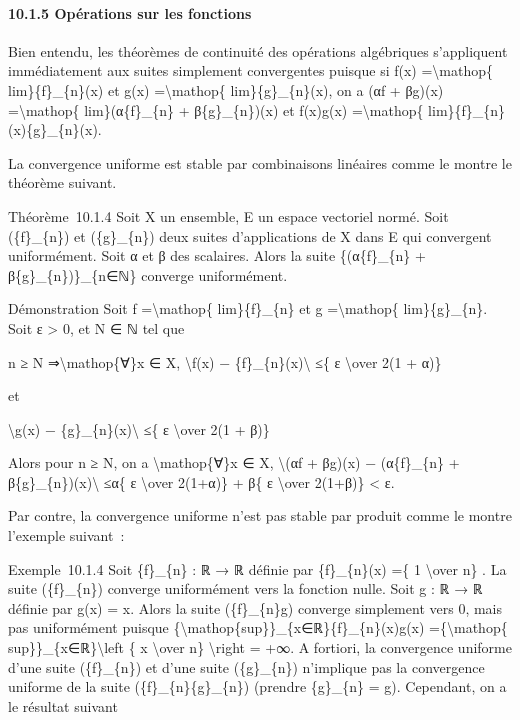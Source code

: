\documentclass[]{article}
\begin{document}
\paragraph{10.1.5 Opérations sur les fonctions}

Bien entendu, les théorèmes de continuité des opérations algébriques
s'appliquent immédiatement aux suites simplement convergentes puisque si
f(x) =\textbackslash{}mathop\{ lim\}\{f\}\_\{n\}(x) et g(x)
=\textbackslash{}mathop\{ lim\}\{g\}\_\{n\}(x), on a (αf + βg)(x)
=\textbackslash{}mathop\{ lim\}(α\{f\}\_\{n\} + β\{g\}\_\{n\})(x) et
f(x)g(x) =\textbackslash{}mathop\{ lim\}\{f\}\_\{n\}(x)\{g\}\_\{n\}(x).

La convergence uniforme est stable par combinaisons linéaires comme le
montre le théorème suivant.

Théorème~10.1.4 Soit X un ensemble, E un espace vectoriel normé. Soit
(\{f\}\_\{n\}) et (\{g\}\_\{n\}) deux suites d'applications de X dans E
qui convergent uniformément. Soit α et β des scalaires. Alors la suite
\{(α\{f\}\_\{n\} + β\{g\}\_\{n\})\}\_\{n∈ℕ\} converge uniformément.

Démonstration Soit f =\textbackslash{}mathop\{ lim\}\{f\}\_\{n\} et g
=\textbackslash{}mathop\{ lim\}\{g\}\_\{n\}. Soit ε \textgreater{} 0, et
N ∈ ℕ tel que

n ≥ N ⇒\textbackslash{}mathop\{∀\}x ∈ X, \textbackslash{}\textbar{}f(x)
− \{f\}\_\{n\}(x)\textbackslash{}\textbar{} ≤\{ ε \textbackslash{}over
2(1 + \textbar{}α\textbar{})\}

et

\textbackslash{}\textbar{}g(x) −
\{g\}\_\{n\}(x)\textbackslash{}\textbar{} ≤\{ ε \textbackslash{}over 2(1
+ \textbar{}β\textbar{})\}

Alors pour n ≥ N, on a \textbackslash{}mathop\{∀\}x ∈ X,
\textbackslash{}\textbar{}(αf + βg)(x) − (α\{f\}\_\{n\} +
β\{g\}\_\{n\})(x)\textbackslash{}\textbar{} ≤\textbar{}α\textbar{}\{ ε
\textbackslash{}over 2(1+\textbar{}α\textbar{})\} +
\textbar{}β\textbar{}\{ ε \textbackslash{}over
2(1+\textbar{}β\textbar{})\} \textless{} ε.

Par contre, la convergence uniforme n'est pas stable par produit comme
le montre l'exemple suivant~:

Exemple~10.1.4 Soit \{f\}\_\{n\} : ℝ → ℝ définie par \{f\}\_\{n\}(x) =\{
1 \textbackslash{}over n\} . La suite (\{f\}\_\{n\}) converge
uniformément vers la fonction nulle. Soit g : ℝ → ℝ définie par g(x) =
x. Alors la suite (\{f\}\_\{n\}g) converge simplement vers 0, mais pas
uniformément puisque
\{\textbackslash{}mathop\{sup\}\}\_\{x∈ℝ\}\textbar{}\{f\}\_\{n\}(x)g(x)\textbar{}
=\{\textbackslash{}mathop\{ sup\}\}\_\{x∈ℝ\}\textbackslash{}left
\textbar{}\{ x \textbackslash{}over n\} \textbackslash{}right \textbar{}
= +∞. A fortiori, la convergence uniforme d'une suite (\{f\}\_\{n\}) et
d'une suite (\{g\}\_\{n\}) n'implique pas la convergence uniforme de la
suite (\{f\}\_\{n\}\{g\}\_\{n\}) (prendre \{g\}\_\{n\} = g). Cependant,
on a le résultat suivant
\end{document}
